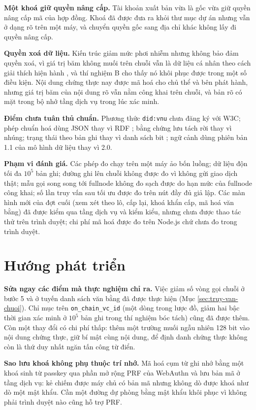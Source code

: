 \textbf{Một khoá giữ quyền nâng cấp.} Tài khoản xuất bản vừa là gốc vừa giữ quyền nâng cấp mã của hợp đồng. Khoá đã được đưa ra khỏi thư mục dự án nhưng vẫn ở dạng rõ trên một máy, và chuyển quyền gốc sang địa chỉ khác không lấy đi quyền nâng cấp.

\textbf{Quyền xoá dữ liệu.} Kiến trúc giảm mức phơi nhiễm nhưng không bảo đảm quyền xoá, vì giá trị băm không muối trên chuỗi vẫn là dữ liệu cá nhân theo cách giải thích hiện hành \cite{EDPB2025}, và thí nghiệm B cho thấy nó khôi phục được trong một số điều kiện. Nội dung chứng thực nay được mã hoá cho chủ thể và bên phát hành, nhưng giá trị băm của nội dung rõ vẫn nằm công khai trên chuỗi, và bản rõ có mặt trong bộ nhớ tầng dịch vụ trong lúc xác minh.

\textbf{Điểm chưa tuân thủ chuẩn.} Phương thức \texttt{did:vnu} chưa đăng ký với W3C; phép chuẩn hoá dùng JSON thay vì RDF \cite{W3C_RDFC2024}; bằng chứng lưu tách rời thay vì nhúng; trạng thái theo bản ghi thay vì danh sách bit \cite{W3C_BitstringStatusList2025}; ngữ cảnh dùng phiên bản 1.1 của mô hình dữ liệu thay vì 2.0.

\textbf{Phạm vi đánh giá.} Các phép đo chạy trên một máy ảo bốn luồng; dữ liệu độn tối đa $10^5$ bản ghi; đường ghi lên chuỗi không được đo vì không gửi giao dịch thật; mẫu gọi song song tới fullnode không đo sạch được do hạn mức của fullnode công khai; số lần truy vấn sau tối ưu được đo trên nút đầy đủ giả lập. Các màn hình mới của đợt cuối (xem xét theo lô, cấp lại, khoá khẩn cấp, mã hoá văn bằng) đã được kiểm qua tầng dịch vụ và kiểm kiểu, nhưng chưa được thao tác thử trên trình duyệt; chi phí mã hoá được đo trên Node.js chứ chưa đo trong trình duyệt.

\section{Hướng phát triển}
\label{sec:huong-phat-trien}

\textbf{Sửa ngay các điểm mà thực nghiệm chỉ ra.} Việc giảm số vòng gọi chuỗi ở bước 5 và ở tuyến danh sách văn bằng đã được thực hiện (Mục \ref{sec:truy-van-chuoi}). Chỉ mục trên \texttt{on\_chain\_vc\_id} (một dòng trong lược đồ, giảm hai bậc thời gian xác minh ở $10^5$ bản ghi trong thí nghiệm bóc tách) cũng đã được thêm. Còn một thay đổi có chi phí thấp: thêm một trường muối ngẫu nhiên 128 bit vào nội dung chứng thực, giữ bí mật cùng nội dung, để định danh chứng thực không còn là thứ duy nhất ngăn tấn công từ điển.

\textbf{Sao lưu khoá không phụ thuộc trí nhớ.} Mã hoá cụm từ ghi nhớ bằng một khoá sinh từ passkey qua phần mở rộng PRF của WebAuthn và lưu bản mã ở tầng dịch vụ: kẻ chiếm được máy chủ có bản mã nhưng không dò được khoá như dò một mật khẩu. Cần một đường dự phòng bằng mật khẩu khôi phục vì không phải trình duyệt nào cũng hỗ trợ PRF.

